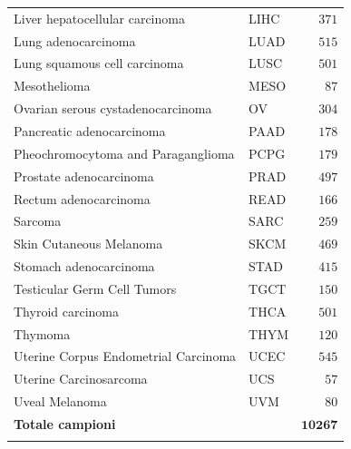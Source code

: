 \begin{table}[htbp]
{\begin{tabular}{llr}
    Liver hepatocellular carcinoma                  & LIHC & $371$  \\
    Lung adenocarcinoma                             & LUAD & $515$  \\
    Lung squamous cell carcinoma                    & LUSC & $501$  \\
    Mesothelioma                                    & MESO & $87$   \\
    Ovarian serous cystadenocarcinoma               & OV   & $304$  \\
    Pancreatic adenocarcinoma                       & PAAD & $178$  \\
    Pheochromocytoma and Paraganglioma              & PCPG & $179$  \\
    Prostate adenocarcinoma                         & PRAD & $497$  \\
    Rectum adenocarcinoma                           & READ & $166$  \\ 
    Sarcoma                                         & SARC & $259$  \\ 
    Skin Cutaneous Melanoma                         & SKCM & $469$  \\ 
    Stomach adenocarcinoma                          & STAD & $415$  \\ 
    Testicular Germ Cell Tumors                     & TGCT & $150$  \\ 
    Thyroid carcinoma                               & THCA & $501$  \\ 
    Thymoma                                         & THYM & $120$  \\ 
    Uterine Corpus Endometrial Carcinoma            & UCEC & $545$  \\ 
    Uterine Carcinosarcoma                          & UCS  & $57$   \\ 
    Uveal Melanoma                                  & UVM  & $80$   \\ 
    \midrule
    \textbf{Totale campioni}                        &      & $\mathbf{10267}$  \\
    \bottomrule
    \label{tab:tumor-samples}
    \end{tabular} 
    } %
\end{table}

